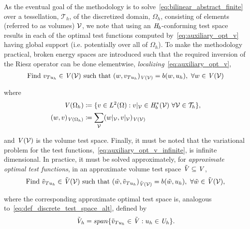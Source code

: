As the eventual goal of the methodology is to solve~\eqref{eq:bilinear_abstract_finite} over a tessellation,
$\mathcal{T}_h$, of the discretized domain, $\Omega_h$, consisting of elements (referred to as volumes) $\mathcal{{{V}}}$, we
note that using an $\mathit{{{H}}}_b$-conforming test space results in each of the optimal test functions computed
by~\eqref{eq:auxiliary_opt_v} having global support (i.e. potentially over all of $\Omega_h$).  To make the methodology
practical, broken energy spaces are introduced such that the required inversion of the Riesz operator can be done
elementwise, \emph{localizing}~\eqref{eq:auxiliary_opt_v},
\begin{align} \label{eq:auxiliary_opt_v_infinite}
\text{Find}\ v_{T u_h} \in \mathit{{{V}}}(\mathcal{{{V}}})\ \text{such that}\
(w,v_{T u_h})_{\mathit{{{V}}}(\mathcal{{{V}}})} = b(w,u_h),\ \forall w \in \mathit{{{V}}}(\mathcal{{{V}}})
\end{align}

where 
\begin{align}
\mathit{{{V}}}(\Omega_h) 
&\coloneqq
\{ v \in L^2(\Omega) : v|_{\mathcal{{{V}}}} \in \mathit{{{H}}}_b^*(\mathcal{{{V}}})\ \forall \mathcal{{{V}}} \in \mathcal{T}_h \}, \\
(w,v)_{\mathit{{{V}}}(\Omega_h)}
&\coloneqq
\sum_{\mathcal{{{V}}}} (w|_{\mathcal{{{V}}}},v|_{\mathcal{{{V}}}})_{\mathit{{{V}}}(\mathcal{{{V}}})}
\end{align}

and $\mathit{{{V}}}(\mathcal{{{V}}})$ is the volume test space. Finally, it must be noted that the variational problem for the test
functions,~\eqref{eq:auxiliary_opt_v_infinite}, is infinite dimensional. In practice, it must be solved approximately, for
\textit{approximate optimal test functions}, in an approximate volume test space $\tilde{\mathit{{{V}}}} \subseteq \mathit{{{V}}}$,
\begin{align} \label{eq:auxiliary_opt_v_finite}
\text{Find}\ \tilde{v}_{T u_h} \in \afspace{V}(\fe{V})\ \text{such that}\
(\tilde{w},\tilde{v}_{T u_h})_{\afspace{V}(\fe{V})} = b(\tilde{w},u_h),\ \forall \tilde{w} \in \afspace{V}(\fe{V}),
\end{align}

where the corresponding approximate optimal test space is, analogous to~\eqref{eq:def_discrete_test_space_alt}, defined by
\begin{align} \label{eq:def_discrete_test_space_alt_approx}
\tilde{\mathit{{{V}}}}_h = span \{ \tilde{v}_{T u_h} \in \tilde{\mathit{{{V}}}} : u_h \in \mathit{{{U}}}_h \}.
\end{align}


